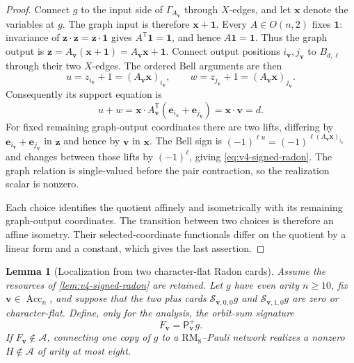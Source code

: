 \documentclass[11pt,letterpaper,onecolumn]{article}
\theoremstyle{plain}
\newtheorem{lemma}[lemma]{Lemma}
\theoremstyle{definition}
\theoremstyle{remark}
\newcommand{\cA}{\mathscr A}
\newcommand{\one}{\mathbf 1}
\newcommand{\RMcore}{\mathrm{RM}_8}
\begin{document}
\begin{proof}
Connect \(g\) to the input side of \(\Gamma_{A_{\mathbf{v}}}\) through \(X\)-edges, and let \({\mathbf{x}}\) denote the variables at \(g\).  The graph input
is therefore \({\mathbf{x}}+\one\).  Every \(A\in O(n,2)\) fixes \(\one\): invariance
of \({\mathbf{z}}\cdot {\mathbf{z}}={\mathbf{z}}\cdot\one\) gives \(A^{\mathsf T}\one=\one\), and hence
\(A\one=\one\).  Thus the graph output is
\({\mathbf{z}}=A_{\mathbf{v}}({\mathbf{x}}+\one)=A_{\mathbf{v}}{\mathbf{x}}+\one\).  Connect output positions \(i_{\mathbf{v}},j_{\mathbf{v}}\) to
\(B_{d,\ell}\) through their two \(X\)-edges.  The ordered Bell
arguments are then
\[
 u=z_{i_{\mathbf{v}}}+1=(A_{\mathbf{v}}{\mathbf{x}})_{i_{\mathbf{v}}},
 \qquad
 w=z_{j_{\mathbf{v}}}+1=(A_{\mathbf{v}}{\mathbf{x}})_{j_{\mathbf{v}}}.
\]
Consequently its support equation is
\[
 u+w
 ={\mathbf{x}}\cdot A_{\mathbf{v}}^{\mathsf T}({\mathbf{e}}_{i_{\mathbf{v}}}+{\mathbf{e}}_{j_{\mathbf{v}}})
 ={\mathbf{x}}\cdot {\mathbf{v}}=d.
\]
For fixed remaining graph-output coordinates there are two lifts, differing
by \({\mathbf{e}}_{i_{\mathbf{v}}}+{\mathbf{e}}_{j_{\mathbf{v}}}\) in \({\mathbf{z}}\) and hence by \({\mathbf{v}}\) in \({\mathbf{x}}\).  The Bell sign
is \((-1)^{\ell u}=(-1)^{\ell(A_{\mathbf{v}}{\mathbf{x}})_{i_{\mathbf{v}}}}\) and changes between those
lifts by \((-1)^\ell\), giving
\cref{eq:v4-signed-radon}.  The graph relation is single-valued before the
pair contraction, so the realization scalar is nonzero.

Each choice identifies the quotient affinely and isometrically with its
remaining graph-output coordinates.  The transition between two choices is
therefore an affine isometry.  Their selected-coordinate functionals differ
on the quotient by a linear form and a constant, which gives the last
assertion.
\end{proof}

\begin{lemma}[Localization from two character-flat Radon cards]
\label{lem:v4-character-two-chart}
Assume the resources of \cref{lem:v4-signed-radon} are retained.  Let
\(g\) have even arity \(n\ge10\), fix
\({\mathbf{v}}\in\operatorname{Acc}_n\), and suppose that the two plus cards
\(\mathcal S_{{\mathbf{v}},0,0}g\) and \(\mathcal S_{{\mathbf{v}},1,0}g\) are zero or
character-flat.  Define, only for the analysis, the orbit-sum signature
\[
 F_{\mathbf{v}}=\mathsf P_{\mathbf{v}}^+g.
\]
If \(F_{\mathbf{v}}\notin\cA\), connecting one copy of \(g\) to a
\(\RMcore\)--Pauli network realizes a nonzero \(H\notin\cA\) of
arity at most eight.
\end{lemma}
\end{document}
